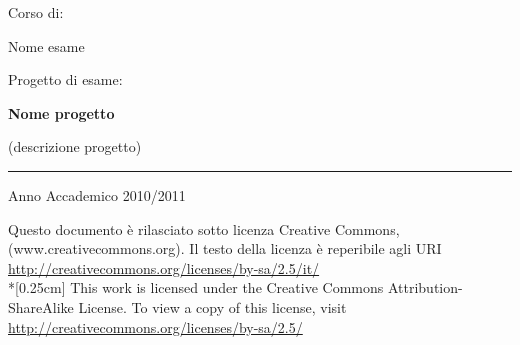 \begin{titlepage}
\begin{center}
        \small{Corso di:}
        
        {\Large Nome esame}
        
        \vspace{0.4cm}
        
        \small{Progetto di esame:}
        
        \textbf{\Large Nome progetto}

        \scriptsize{(descrizione progetto)}
        
        \vspace{1cm}
        
        \hfil{
        }\hfil
        
        \rule[1mm]{\textwidth}{0.2mm}
        Anno Accademico 2010/2011
        
        \vspace{0.4cm}
        
            \scriptsize{
                Questo documento è rilasciato sotto licenza Creative Commons, (www.creativecommons.org). 
                Il testo della licenza è reperibile agli URI \url{http://creativecommons.org/licenses/by-sa/2.5/it/}
                \\*[0.25cm]
                This work is licensed under the Creative Commons Attribution-ShareAlike License. 
                To view a copy of this license, visit \url{http://creativecommons.org/licenses/by-sa/2.5/}
            }
    \end{center}
\end{titlepage}
